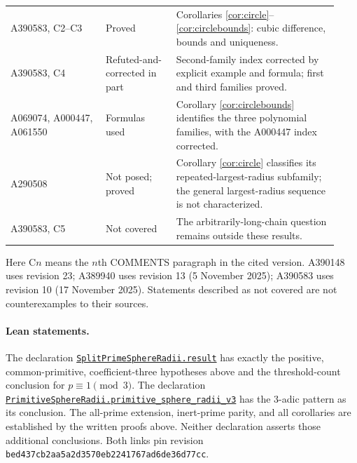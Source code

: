 \documentclass[11pt]{article}
\begin{document}
\begin{longtable}{@{}>{\raggedright\arraybackslash}p{0.27\linewidth}>{\raggedright\arraybackslash}p{0.20\linewidth}>{\raggedright\arraybackslash}p{0.46\linewidth}@{}}
A390583, C2--C3 & Proved & Corollaries \ref{cor:circle}--\ref{cor:circlebounds}: cubic difference, bounds and uniqueness.\\[3pt]
A390583, C4 & Refuted-and-corrected in part & Second-family index corrected by explicit example and formula; first and third families proved.\\[3pt]
A069074, A000447, A061550 & Formulas used & Corollary \ref{cor:circlebounds} identifies the three polynomial families, with the A000447 index corrected.\\[3pt]
A290508 & Not posed; proved & Corollary \ref{cor:circle} classifies its repeated-largest-radius subfamily; the general largest-radius sequence is not characterized.\\[3pt]
A390583, C5 & Not covered & The arbitrarily-long-chain question remains outside these results.\\
\bottomrule
\end{longtable}
Here C$n$ means the $n$th COMMENTS paragraph in the cited version.
A390148 uses revision 23; A389940 uses revision 13 (5 November 2025);
A390583 uses revision 10 (17 November 2025). Statements described as
not covered are not counterexamples to their sources.

\paragraph{Lean statements.}
The declaration
\href{https://github.com/the-omega-institute/trureturing/blob/bed437cb2aa5a2d3570eb2241767ad6de36d77cc/D5/S3/Arith/Descartes/SplitPrimeSphereRadii.lean}{\texttt{SplitPrimeSphereRadii.result}}
has exactly the positive, common-primitive, coefficient-three hypotheses
above and the threshold-count conclusion for $p\equiv1\pmod3$.
The declaration
\href{https://github.com/the-omega-institute/trureturing/blob/bed437cb2aa5a2d3570eb2241767ad6de36d77cc/D5/S3/Arith/Descartes/PrimitiveSphereRadii.lean}{\texttt{PrimitiveSphereRadii.primitive\_sphere\_radii\_v3}}
has the $3$-adic pattern as its conclusion. The all-prime extension,
inert-prime parity, and all corollaries are established by the written
proofs above. Neither declaration asserts those additional conclusions.
Both links pin revision \texttt{bed437cb2aa5a2d3570eb2241767ad6de36d77cc}.
\end{document}
